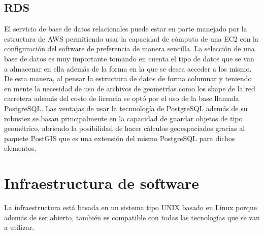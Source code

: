 \subsection{RDS}
El servicio de base de datos relacionales puede estar en parte manejado por la estructura de AWS permitiendo usar la capacidad de cómputo de una EC2 con la configuración del software de preferencia de manera sencilla. La selección de una base de datos es muy importante tomando en cuenta el tipo de datos que se van a almacenar en ella además de la forma en la que se desea acceder a los mismo. De esta manera, al pensar la estructura de datos de forma columnar y teniendo en mente la necesidad de uso de archivos de geometrías como los shape de la red carretera además del costo de licencia se optó por el uso de la base llamada PostgreSQL. Las ventajas de usar la tecnnología de PostgreSQL además de su robustez se basan principalmente en la capacidad de guardar objetos de tipo geométrico, abriendo la posibilidad de hacer cálculos geoespaciados gracias al paquete PostGIS que es una extensión del mismo PostgreSQL para dichos elementos.

\section{Infraestructura de software}
La infraestructura está basada en un sistema tipo UNIX basado en Linux porque además de ser abierto, también es compatible con todas las tecnologías que se van a utilizar.\\
